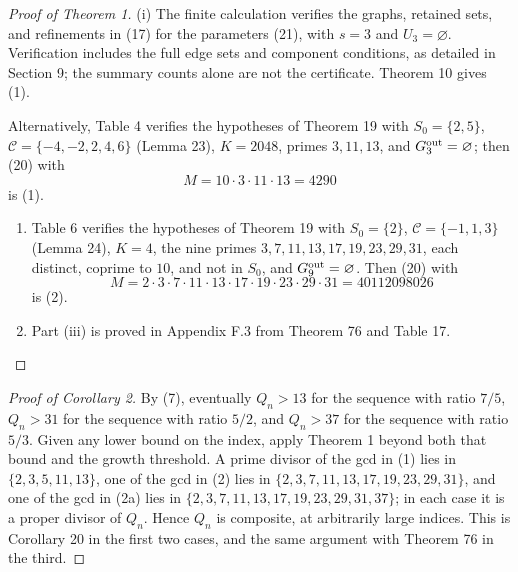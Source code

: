 \documentclass[11pt,reqno]{amsart}
\theoremstyle{definition}
\theoremstyle{remark}
\providecommand{\tightlist}{\setlength{\itemsep}{0pt}\setlength{\parskip}{0pt}}
\begin{document}
\begin{proof}[Proof of Theorem 1]\leavevmode\label{proof:1}
(i) The finite calculation verifies the graphs,
retained sets, and refinements in (17) for the parameters (21), with
\(s=3\) and \(U_3=\varnothing\). Verification includes the full edge
sets and component conditions, as detailed in Section 9; the summary
counts alone are not the certificate. Theorem 10 gives (1).

Alternatively, Table 4 verifies the hypotheses of Theorem 19 with
\(S_0=\{2,5\}\), \(\mathcal C=\{-4,-2,2,4,6\}\) (Lemma 23),
\(K=2048\), primes \(3,11,13\), and \(G_3^{\rm out}=\varnothing\);
then (20) with
\[
M=10\cdot3\cdot11\cdot13=4290
\]
is (1).

\begin{enumerate}
\def\labelenumi{(\roman{enumi})}
\setcounter{enumi}{1}
\tightlist
\item
  Table 6 verifies the hypotheses of Theorem 19 with
  \(S_0=\{2\}\), \(\mathcal C=\{-1,1,3\}\) (Lemma 24), \(K=4\), the nine
  primes \(3,7,11,13,17,19,23,29,31\), each distinct, coprime to
  \(10\), and not in \(S_0\), and \(G_9^{\rm out}=\varnothing\). Then
(20) with
\[
M=2\cdot3\cdot7\cdot11\cdot13\cdot17\cdot19\cdot23\cdot29\cdot31
=40112098026
\]
is (2).
\item
  Part (iii) is proved in Appendix F.3 from Theorem 76 and Table 17. \qedhere
\end{enumerate}
\end{proof}

\begin{proof}[Proof of Corollary 2]\leavevmode\label{proof:2}
By (7), eventually \(Q_n>13\) for the
sequence with ratio \(7/5\), \(Q_n>31\) for the sequence with ratio
\(5/2\), and \(Q_n>37\) for the sequence with ratio \(5/3\). Given any
lower bound on the index, apply Theorem 1 beyond both
that bound and the growth threshold. A prime divisor of the gcd in (1)
lies in \(\{2,3,5,11,13\}\), one of the gcd in (2) lies in
\(\{2,3,7,11,13,17,19,23,29,31\}\), and one of the gcd in (2a) lies in
\(\{2,3,7,11,13,17,19,23,29,31,37\}\); in each case it is a proper divisor
of \(Q_n\). Hence \(Q_n\) is composite, at arbitrarily large indices.
This is Corollary 20 in the first two cases, and the same argument with
Theorem 76 in the third. \qedhere
\end{proof}
\end{document}
